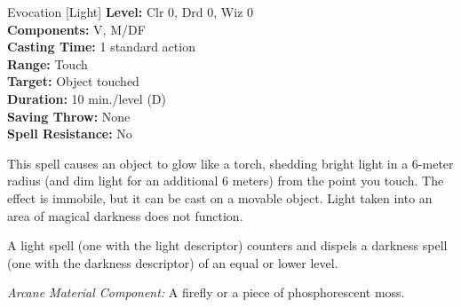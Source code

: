 {Evocation [Light]}
{
	\textbf{Level:}
	Clr 0, Drd 0, Wiz 0\\
	\textbf{Components:}
	V, M/DF\\
	\textbf{Casting Time:}
	1 standard action\\
	\textbf{Range:}
	Touch\\
	\textbf{Target:}
	Object touched\\
	\textbf{Duration:}
	10 min./level (D)\\
	\textbf{Saving Throw:}
	None\\
	\textbf{Spell Resistance:}
	No\\
}
{
	This spell causes an object to glow like a torch, shedding bright light in a 6-meter radius (and dim light for an additional 6 meters) from the point you touch. The effect is immobile, but it can be cast on a movable object. Light taken into an area of magical darkness does not function.

	A light spell (one with the light descriptor) counters and dispels a darkness spell (one with the darkness descriptor) of an equal or lower level.

	\textit{Arcane Material Component:}
	A firefly or a piece of phosphorescent moss.

}

